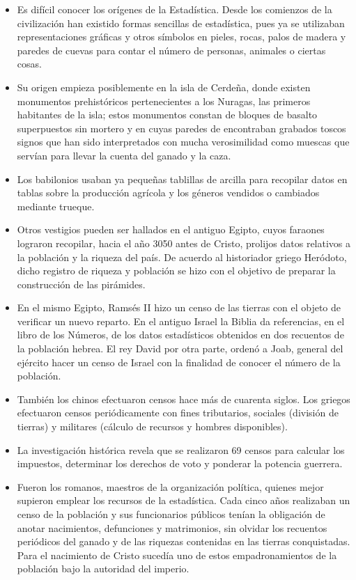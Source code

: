 \begin{itemize}
    \item Es dif\'icil conocer los or\'igenes de la Estad\'istica. Desde los comienzos de la civilizaci\'on han existido formas sencillas de estad\'istica, pues ya se utilizaban representaciones gr\'aficas y otros s\'imbolos en pieles, rocas, palos de madera y paredes de cuevas para contar el n\'umero de personas, animales o ciertas cosas. 
    \item Su origen empieza posiblemente en la isla de Cerde\~na, donde existen monumentos prehist\'oricos pertenecientes a los Nuragas, las primeros habitantes de la isla; estos monumentos constan de bloques de basalto superpuestos sin mortero y en cuyas paredes de encontraban grabados toscos signos que han sido interpretados con mucha verosimilidad como muescas que serv\'ian para llevar la cuenta del ganado y la caza.
    \item Los babilonios usaban ya peque\~nas tablillas de arcilla para recopilar datos en tablas sobre la producci\'on agr\'icola y los g\'eneros vendidos o cambiados mediante trueque. 
    \item Otros vestigios pueden ser hallados en el antiguo Egipto, cuyos faraones lograron recopilar, hacia el a\~no 3050 antes de Cristo, prolijos datos relativos a la poblaci\'on y la riqueza del pa\'is. De acuerdo al historiador griego Her\'odoto, dicho registro de riqueza y poblaci\'on se hizo con el objetivo de preparar la construcci\'on de las pir\'amides.
    \item En el mismo Egipto, Rams\'es II hizo un censo de las tierras con el objeto de verificar un nuevo reparto. En el antiguo Israel la Biblia da referencias, en el libro de los N\'umeros, de los datos estad\'isticos obtenidos en dos recuentos de la poblaci\'on hebrea. El rey David por otra parte, orden\'o a Joab, general del ej\'ercito hacer un censo de Israel con la finalidad de conocer el n\'umero de la poblaci\'on.
    \item Tambi\'en los chinos efectuaron censos hace m\'as de cuarenta siglos. Los griegos efectuaron censos peri\'odicamente con fines tributarios, sociales (divisi\'on de tierras) y militares (c\'alculo de recursos y hombres disponibles). 
    \item La investigaci\'on hist\'orica revela que se realizaron 69 censos para calcular los impuestos, determinar los derechos de voto y ponderar la potencia guerrera.
    \item Fueron los romanos, maestros de la organizaci\'on pol\'itica, quienes mejor supieron emplear los recursos de la estad\'istica. Cada cinco a\~nos realizaban un censo de la poblaci\'on y sus funcionarios p\'ublicos ten\'ian la obligaci\'on de anotar nacimientos, defunciones y matrimonios, sin olvidar los recuentos peri\'odicos del ganado y de las riquezas contenidas en las tierras conquistadas. Para el nacimiento de Cristo suced\'ia uno de estos empadronamientos de la poblaci\'on bajo la autoridad del imperio. 

\end{itemize}
